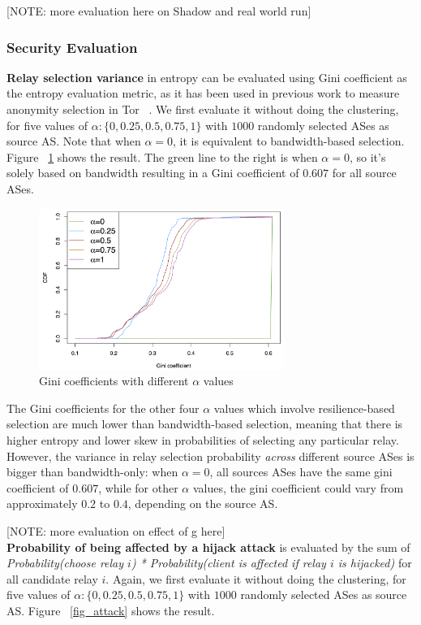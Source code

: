 [NOTE: more evaluation here on Shadow and real world run]

\subsubsection{Security Evaluation}

\textbf{Relay selection variance} in entropy can be evaluated using Gini coefficient as the entropy evaluation metric, as it has been used in previous work to measure anonymity selection in Tor ~\cite{akhoondi2012lastor}. We first evaluate it without doing the clustering, for five values of $\alpha: \{0, 0.25, 0.5, 0.75, 1\}$ with $1000$ randomly selected ASes as source AS. Note that when $\alpha = 0$, it is equivalent to bandwidth-based selection. Figure ~\ref{fig_gini} shows the result. The green line to the right is when $\alpha = 0$, so it's solely based on bandwidth resulting in a Gini coefficient of $0.607$ for all source ASes. 

\begin{figure}[ht!]
\centering
\includegraphics[width=80mm]{figure/gini}
\caption{Gini coefficients with different $\alpha$ values \label{fig_gini}}
\end{figure}

The Gini coefficients for the other four $\alpha$ values which involve resilience-based selection are much lower than bandwidth-based selection, meaning that there is higher entropy and lower skew in probabilities of selecting any particular relay. However, the variance in relay selection probability \emph{across} different source ASes is bigger than bandwidth-only: when $\alpha = 0$, all sources ASes have the same gini coefficient of $0.607$, while for other $\alpha$ values, the gini coefficient could vary from approximately $0.2$ to $0.4$, depending on the source AS. 

[NOTE: more evaluation on effect of g here]\\

\textbf{Probability of being affected by a hijack attack} is evaluated by the sum of \emph{Probability(choose relay $i$) * Probability(client is affected if relay $i$ is hijacked)} for all candidate relay $i$. Again, we first evaluate it without doing the clustering, for five values of $\alpha: \{0, 0.25, 0.5, 0.75, 1\}$ with $1000$ randomly selected ASes as source AS. Figure ~\ref{fig_attack} shows the result. 

